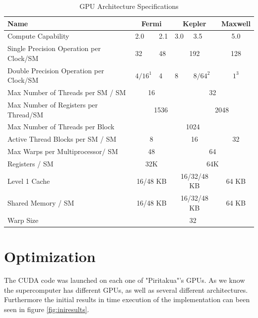 \begin{table}[h]
\centering
  \begin{tabular} { | l | l  | l | l | l  |  l  | l |}
    \hline
    Name & \multicolumn{2}{|c|}{Fermi} & \multicolumn{2}{|c|}{Kepler} &  \multicolumn{2}{|c|}{Maxwell} \\
    \hline
    Compute Capability & 2.0 & 2.1 & 3.0 & 3.5 & \multicolumn{2}{|c|}{5.0}\\
   \hline
    Single Precision Operation per Clock/SM & 32 & 48 & \multicolumn{2}{|c|}{192} & \multicolumn{2}{|c|}{128}\\
   \hline
    Double Precision Operation per Clock/SM & $4/16^1$ & 4 & 8 & $8/64^2$ & \multicolumn{2}{|c|}{$1^3$}\\
   \hline
    Max Number of Threads per SM / SM & \multicolumn{2}{|c|}{16} & \multicolumn{4}{|c|}{32}\\
   \hline
    Max Number of Registers per Thread/SM & \multicolumn{3}{|c|}{1536} & \multicolumn{3}{|c|}{2048}\\
   \hline
       Max Number of Threads per Block & \multicolumn{6}{|c|}{1024}\\
   \hline
   Active Thread Blocks per SM / SM & \multicolumn{2}{|c|}{8} & \multicolumn{2}{|c|}{16} & \multicolumn{2}{|c|}{32}\\
   \hline
   Max Warps per Multiprocessor/ SM & \multicolumn{2}{|c|}{48} & \multicolumn{4}{|c|}{64}\\
   \hline
   Registers / SM & \multicolumn{2}{|c|}{32K} & \multicolumn{4}{|c|}{64K}\\
   \hline
   Level 1 Cache & \multicolumn{2}{|c|}{16/48 KB} & \multicolumn{2}{|c|}{16/32/48 KB} & \multicolumn{2}{|c|}{64 KB}\\
   \hline
   Shared Memory / SM & \multicolumn{2}{|c|}{16/48 KB} & \multicolumn{2}{|c|}{16/32/48 KB} & \multicolumn{2}{|c|}{64 KB}\\
   \hline
   Warp Size & \multicolumn{6}{c|}{32}  \\
   \hline
  \end{tabular}
  \caption{GPU Architecture Specifications}
  \label{tab:arch}
  \end{table}
 
\section{Optimization}

The CUDA code was launched on each one of "Piritakua"'s GPUs. As we know the supercomputer has different GPUs, as well as several different  architectures. Furthermore the initial results in time execution of the implementation can been seen in figure \ref{fig:iniresults}.

